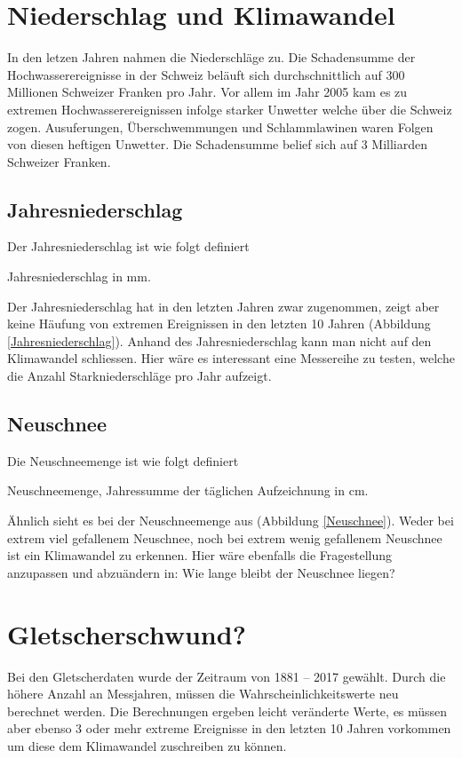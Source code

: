 \begin{refsection}
\section{Niederschlag und Klimawandel}
In den letzen Jahren nahmen die Niederschläge zu. Die Schadensumme der Hochwasserereignisse in der Schweiz beläuft sich durchschnittlich auf 300 Millionen Schweizer Franken pro Jahr. Vor allem im Jahr 2005 kam es zu extremen Hochwasserereignissen infolge starker Unwetter welche über die Schweiz zogen. Ausuferungen, Überschwemmungen und Schlammlawinen waren Folgen von diesen heftigen Unwetter. Die Schadensumme belief sich auf 3 Milliarden Schweizer Franken. 


\subsection{Jahresniederschlag}
Der Jahresniederschlag ist wie folgt definiert

\begin{definition}
Jahresniederschlag in mm.
\end{definition}

Der Jahresniederschlag hat in den letzten Jahren zwar zugenommen, zeigt aber keine Häufung von extremen Ereignissen in den letzten 10 Jahren (Abbildung \ref{Jahresniederschlag}). Anhand des Jahresniederschlag kann man nicht auf den Klimawandel schliessen. Hier wäre es interessant eine Messereihe zu testen, welche die Anzahl Starkniederschläge pro Jahr aufzeigt.


\subsection{Neuschnee}
Die Neuschneemenge ist wie folgt definiert

\begin{definition}
Neuschneemenge, Jahressumme der täglichen Aufzeichnung in cm.
\end{definition}

Ähnlich sieht es bei der Neuschneemenge aus (Abbildung \ref{Neuschnee}). Weder bei extrem viel gefallenem Neuschnee, noch bei extrem wenig gefallenem Neuschnee ist ein Klimawandel zu erkennen. Hier wäre ebenfalls die Fragestellung anzupassen und abzuändern in: Wie lange bleibt der Neuschnee liegen?


\section{Gletscherschwund?}
Bei den Gletscherdaten wurde der Zeitraum von 1881 -- 2017 gewählt. Durch die höhere Anzahl an Messjahren, müssen die Wahrscheinlichkeitswerte neu berechnet werden. Die Berechnungen ergeben leicht veränderte Werte, es müssen aber ebenso 3 oder mehr extreme Ereignisse in den letzten 10 Jahren vorkommen um diese dem Klimawandel zuschreiben zu können.



\end{refsection}
